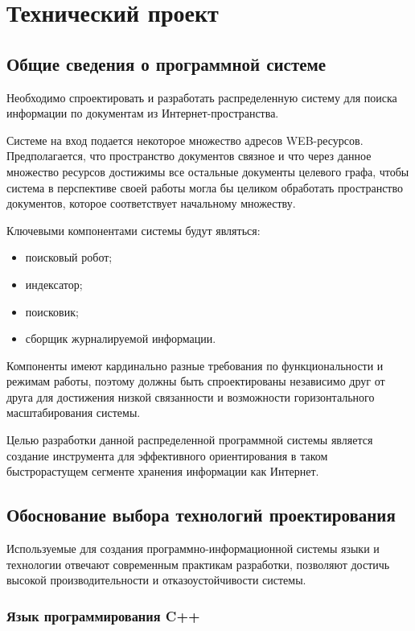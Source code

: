 \section{Технический проект}

\subsection{Общие сведения о программной системе}
Необходимо спроектировать и разработать распределенную систему для поиска информации по документам из Интернет-пространства.

Системе на вход подается некоторое множество адресов WEB-ресурсов.
Предполагается, что пространство документов связное и что через данное множество ресурсов достижимы все остальные документы целевого графа, чтобы система в перспективе своей работы могла бы целиком обработать пространство документов, которое соответствует начальному множеству.

Ключевыми компонентами системы будут являться:
\begin{itemize}
\item поисковый робот;
\item индексатор;
\item поисковик;
\item сборщик журналируемой информации.
\end{itemize}

Компоненты имеют кардинально разные требования по функциональности и режимам работы, поэтому должны быть спроектированы независимо друг от друга для достижения низкой связанности и возможности горизонтального масштабирования системы.

Целью разработки данной распределенной программной системы является создание инструмента для эффективного ориентирования в таком быстрорастущем сегменте хранения информации как Интернет.

\subsection{Обоснование выбора технологий проектирования}
Используемые для создания программно-информационной системы
языки и технологии отвечают современным практикам разработки, позволяют достичь высокой производительности и отказоустойчивости системы.

\subsubsection{Язык программирования C++}

